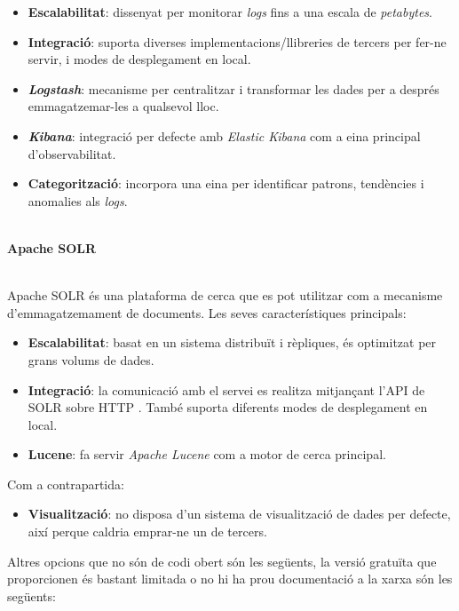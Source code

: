 \begin{itemize}
    \item \textbf{Escalabilitat}: dissenyat per monitorar \textit{\gls{log}s} fins a una escala de \textit{petabytes}.
    \item \textbf{Integració}: suporta diverses implementacions/llibreries de tercers per fer-ne servir, i modes de desplegament en local.
    \item \textbf{\textit{Logstash}}: mecanisme per centralitzar i transformar les dades per a després emmagatzemar-les a qualsevol lloc.
    \item \textbf{\textit{Kibana}}: integració per defecte amb \textit{Elastic Kibana} com a eina principal d’observabilitat.
    \item \textbf{Categorització}: incorpora una eina per identificar patrons, tendències i anomalies als \textit{\gls{log}s}.
\end{itemize}


\noindent \\
\textbf{Apache SOLR~\cite{SOLR}}

\noindent \\
Apache SOLR és una plataforma de cerca que es pot utilitzar com a mecanisme d’emmagatzemament de documents. 
Les seves característiques principals:

\begin{itemize}
    \item \textbf{Escalabilitat}: basat en un sistema distribuït i rèpliques, és optimitzat per grans volums de dades.
    \item \textbf{Integració}: la comunicació amb el servei es realitza mitjançant l’\gls{API} de SOLR sobre \gls{HTTP} .
    També suporta diferents modes de desplegament en local.
    \item \textbf{Lucene}: fa servir \textit{Apache Lucene} com a motor de cerca principal.
\end{itemize}

\noindent
Com a contrapartida:

\begin{itemize}
    \item \textbf{Visualització}: no disposa d’un sistema de visualització de dades per defecte, així perque caldria emprar-ne un de tercers.
\end{itemize}


\clearpage

\noindent
Altres opcions que no són de codi obert són les següents,  la versió gratuïta que proporcionen és bastant limitada o no hi ha prou documentació a la xarxa són les següents:

